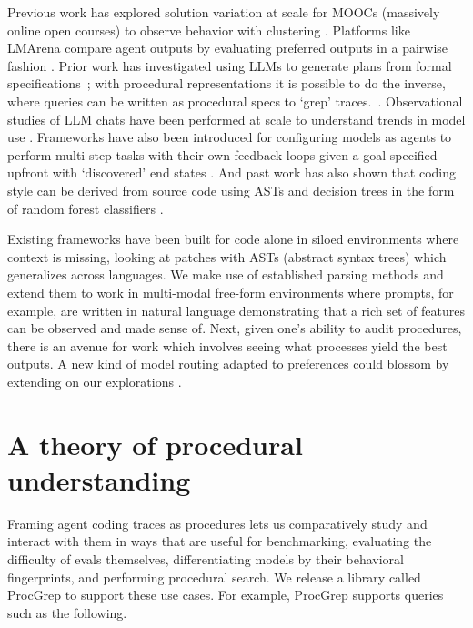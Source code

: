\documentclass[11pt]{article}
\begin{document}
  Previous work has explored solution variation at scale for MOOCs (massively online open courses) to observe behavior with
  clustering \citep{glassman2015overcode}. Platforms like LMArena compare agent outputs by evaluating preferred outputs in a
  pairwise fashion \citep{chiang2024chatbotarenaopenplatform}. Prior work has investigated using LLMs to generate plans
  from formal specifications~\citep{silver2024generalized}; with procedural representations it is possible to do the
  inverse, where queries can be written as procedural specs to `grep'
  traces.~\citep{yin2017syntacticneuralmodelgeneralpurpose}. Observational studies of LLM chats have been performed at scale
  to understand trends in model use \citep{tamkin2024clioprivacypreservinginsightsrealworld, chatterji2025how}. Frameworks
  have also been introduced for configuring models as agents to perform multi-step tasks with their own feedback loops
  given a goal specified upfront with `discovered' end states \citep{yao2023reactsynergizingreasoningacting}. And past work
  has also shown that coding style can be derived from source code using ASTs and decision trees in the form of random
  forest classifiers \citep{code_stylometry}.


  Existing frameworks have been built for code alone in siloed environments where context is missing, looking at patches
  \citep{GumTree2014, yin-neubig-2017-syntactic} with ASTs (abstract syntax trees) which generalizes across languages. We
  make use of established parsing methods and extend them to work in multi-modal free-form environments where prompts, for
  example, are written in natural language \citep{cruz2026textastherichestpreferencesignal} demonstrating that a rich set of
  features can be observed and made sense of. Next, given one's ability to audit procedures, there is an avenue for work
  which involves seeing what processes yield the best outputs. A new kind of model routing adapted to preferences could
  blossom by extending on our explorations \citep{hu2024routerbenchbenchmarkmultillmrouting}.

  \section{A theory of procedural understanding}
  Framing agent coding traces as procedures lets us comparatively study and interact with them in ways that are useful for
  benchmarking, evaluating the difficulty of evals themselves, differentiating models by their behavioral fingerprints, and
  performing procedural search. We release a library called ProcGrep to support these use cases. For example, ProcGrep
  supports queries such as the following.
\end{document}
